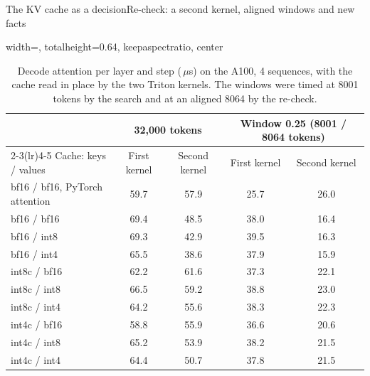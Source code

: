 \documentclass[aspectratio=169,10pt]{beamer}
\newcommand{\us}{\,$\mu$s}
\begin{document}
\begin{frame}{The KV cache as a decision}{Re-check: a second kernel, aligned windows and new facts}
\begin{table}
\centering
\begin{adjustbox}{width=\linewidth, totalheight=0.64\textheight, keepaspectratio, center}
\centering
\small
\begin{tabular}{lcccc}
\toprule
& \multicolumn{2}{c}{32{,}000 tokens} & \multicolumn{2}{c}{Window 0.25 (8001 / 8064 tokens)} \\
\cmidrule(lr){2-3}\cmidrule(lr){4-5}
Cache: keys / values & First kernel & Second kernel & First kernel & Second kernel \\
\midrule
bf16 / bf16, PyTorch attention & 59.7 & 57.9 & 25.7 & 26.0 \\
bf16 / bf16                    & 69.4 & 48.5 & 38.0 & 16.4 \\
bf16 / int8                    & 69.3 & 42.9 & 39.5 & 16.3 \\
bf16 / int4                    & 65.5 & 38.6 & 37.9 & 15.9 \\
int8c / bf16                   & 62.2 & 61.6 & 37.3 & 22.1 \\
int8c / int8                   & 66.5 & 59.2 & 38.8 & 23.0 \\
int8c / int4                   & 64.2 & 55.6 & 38.3 & 22.3 \\
int4c / bf16                   & 58.8 & 55.9 & 36.6 & 20.6 \\
int4c / int8                   & 65.2 & 53.9 & 38.2 & 21.5 \\
int4c / int4                   & 64.4 & 50.7 & 37.8 & 21.5 \\
\bottomrule
\end{tabular}
\end{adjustbox}
\caption{Decode attention per layer and step (\us) on the A100, 4 sequences, with the cache read in place by
the two Triton kernels. The windows were timed at 8001 tokens by the search and at an aligned 8064 by the
re-check.}\label{tab:kv-kernel}
\end{table}
\end{frame}
\end{document}
